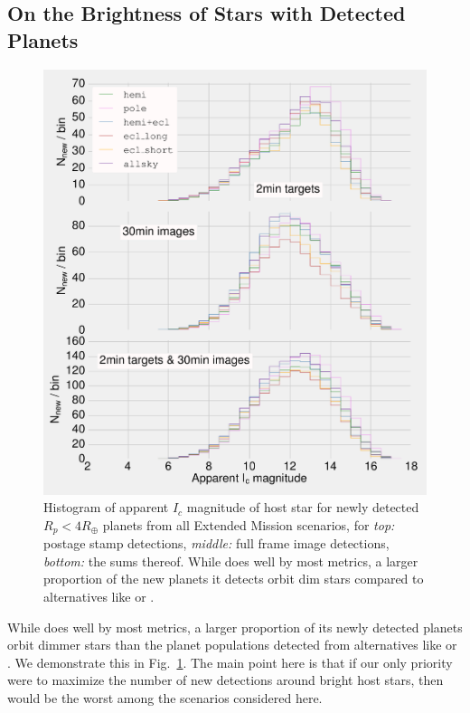 \subsection{On the Brightness of Stars with Detected Planets}
\begin{figure}[!t]
	\centering
	\includegraphics[]{figures/160729_icmag_t50_all.pdf}
	\caption{Histogram of apparent $I_c$ magnitude of host star for newly detected $R_p<4R_\oplus$ planets from all Extended Mission scenarios, for \textit{top:} postage stamp detections, \textit{middle:} full frame image detections, \textit{bottom:} the sums thereof.
	While \npole\:does well by most metrics, a larger proportion of the new planets it detects orbit dim stars compared to alternatives like \hemis\:or \shemiAvoid.}
	\label{fig:icmag_meta}
\end{figure}
While \npole\:does well by most metrics, a larger proportion of its newly 
detected planets orbit dimmer stars than the planet populations detected from 
alternatives like \hemis\:or \shemiAvoid.
We demonstrate this in Fig.~\ref{fig:icmag_meta}.
The main point here is that if our only priority were to maximize the number of new detections around bright host stars, then \npole\:would be the worst among the scenarios considered here.
